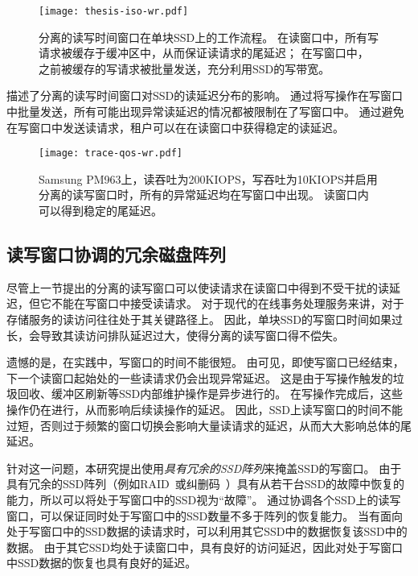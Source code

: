 \begin{figure}[h]
  \centering
  \texttt{[image: thesis-iso-wr.pdf]}
  \caption{
        分离的读写时间窗口在单块SSD上的工作流程。
        在读窗口中，所有写请求被缓存于缓冲区中，从而保证读请求的尾延迟；
        在写窗口中，之前被缓存的写请求被批量发送，充分利用SSD的写带宽。
      }
  \label{fig:design-iso-wr}
\end{figure}

描述了分离的读写时间窗口对SSD的读延迟分布的影响。
通过将写操作在写窗口中批量发送，所有可能出现异常读延迟的情况都被限制在了写窗口中。
通过避免在写窗口中发送读请求，租户可以在在读窗口中获得稳定的读延迟。

\begin{figure}[h]
  \centering
  \texttt{[image: trace-qos-wr.pdf]}
  \caption{
        Samsung PM963上，读吞吐为200KIOPS，写吞吐为10KIOPS并启用分离的读写窗口时，所有的异常延迟均在写窗口中出现。
        读窗口内可以得到稳定的尾延迟。
      }
  \label{fig:design-wr-isolated}
\end{figure}

\subsection{读写窗口协调的冗余磁盘阵列}
\label{sec:design-array-composition}

尽管上一节提出的分离的读写窗口可以使读请求在读窗口中得到不受干扰的读延迟，但它不能在写窗口中接受读请求。
对于现代的在线事务处理服务来讲，对于存储服务的读访问往往处于其关键路径上。
因此，单块SSD的写窗口时间如果过长，会导致其读访问排队延迟过大，使得分离的读写窗口得不偿失。

遗憾的是，在实践中，写窗口的时间不能很短。
由可见，即使写窗口已经结束，下一个读窗口起始处的一些读请求仍会出现异常延迟。
这是由于写操作触发的垃圾回收、缓冲区刷新等SSD内部维护操作是异步进行的。
在写操作完成后，这些操作仍在进行，从而影响后续读操作的延迟。
因此，SSD上读写窗口的时间不能过短，否则过于频繁的窗口切换会影响大量读请求的延迟，从而大大影响总体的尾延迟。

针对这一问题，本研究提出使用\textit{具有冗余的SSD阵列}来掩盖SSD的写窗口。
由于具有冗余的SSD阵列（例如RAID~\cite{patterson1988case}或纠删码~\cite{huang2012erasure}）具有从若干台SSD的故障中恢复的能力，所以可以将处于写窗口中的SSD视为“故障”。
通过协调各个SSD上的读写窗口，可以保证同时处于写窗口中的SSD数量不多于阵列的恢复能力。
当有面向处于写窗口中的SSD数据的读请求时，可以利用其它SSD中的数据恢复该SSD中的数据。
由于其它SSD均处于读窗口中，具有良好的访问延迟，因此对处于写窗口中SSD数据的恢复也具有良好的延迟。

